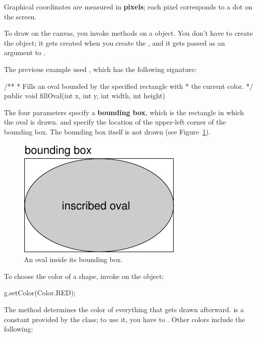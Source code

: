 
Graphical coordinates are measured in {\bf pixels}; each pixel corresponds to a dot on the screen.

To draw on the canvas, you invoke methods on a  object.
You don't have to create the  object; it gets created when you create the , and it gets passed as an argument to .

The previous example used , which has the following signature:

\begin{code}
/**
 * Fills an oval bounded by the specified rectangle with
 * the current color.
 */
public void fillOval(int x, int y, int width, int height)
\end{code}


The four parameters specify a {\bf bounding box}, which is the rectangle in which the oval is drawn.
 and  specify the location of the upper-left corner of the bounding box.
The bounding box itself is not drawn (see Figure~\ref{fig.circle}).

\begin{figure}[!ht]
\begin{center}
\includegraphics{figs/circle.pdf}
\caption{An oval inside its bounding box.}
\label{fig.circle}
\end{center}
\end{figure}


To choose the color of a shape, invoke  on the  object:

\begin{code}
g.setColor(Color.RED);
\end{code}

The  method determines the color of everything that gets drawn afterward.
 is a constant provided by the  class; to use it, you have to .
Other colors include the following:

